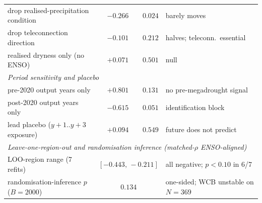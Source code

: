 \begin{table}[H]
\begin{tabular}{lrrl}
\quad drop realised-precipitation condition     & $-0.266$ & $0.024$ & barely moves \\
\quad drop teleconnection direction             & $-0.101$ & $0.212$ & halves; teleconn.\ essential \\
\quad realised dryness only (no ENSO)           & $+0.071$ & $0.501$ & null \\
\midrule
\multicolumn{4}{l}{\emph{Period sensitivity and placebo}} \\
\quad pre-2020 output years only                & $+0.801$ & $0.131$ & no pre-megadrought signal \\
\quad post-2020 output years only               & $-0.615$ & $0.051$ & identification block \\
\quad lead placebo ($y\!+\!1..y\!+\!3$ exposure)  & $+0.094$ & $0.549$ & future does not predict \\
\midrule
\multicolumn{4}{l}{\emph{Leave-one-region-out and randomisation inference (matched-$\rho$ ENSO-aligned)}} \\
\quad LOO-region range (7 refits)               & \multicolumn{2}{c}{$[-0.443,\,-0.211]$} & all negative; $p<0.10$ in 6/7 \\
\quad randomisation-inference $p$ ($B{=}2000$)    & \multicolumn{2}{c}{$0.134$} & one-sided; WCB unstable on $N{=}369$ \\
\bottomrule
\end{tabular}
\end{table}
